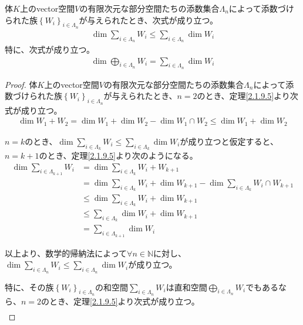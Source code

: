 \documentclass[dvipdfmx]{jsarticle}
\begin{document}
\begin{thm}\label{2.2.1.3}
体$K$上のvector空間$V$の有限次元な部分空間たちの添数集合$\varLambda_{n}$によって添数づけられた族$\left\{ W_{i} \right\}_{i \in \varLambda_{n}}$が与えられたとき、次式が成り立つ。
\begin{align*}
\dim{\sum_{i \in \varLambda_{n}} W_{i}} \leq \sum_{i \in \varLambda_{n}} {\dim W_{i}}
\end{align*}
特に、次式が成り立つ。
\begin{align*}
\dim{\bigoplus_{i \in \varLambda_{n}} W_{i}} = \sum_{i \in \varLambda_{n}} {\dim W_{i}}
\end{align*}
\end{thm}
\begin{proof}
体$K$上のvector空間$V$の有限次元な部分空間たちの添数集合$\varLambda_{n}$によって添数づけられた族$\left\{ W_{i} \right\}_{i \in \varLambda_{n}}$が与えられたとき、$n = 2$のとき、定理\ref{2.1.9.5}より次式が成り立つ。
\begin{align*}
\dim{W_{1} + W_{2}} = \dim W_{1} + \dim W_{2} - \dim{W_{1} \cap W_{2}} \leq \dim W_{1} + \dim W_{2}
\end{align*}\par
$n = k$のとき、$\dim{\sum_{i \in \varLambda_{k}} W_{i}} \leq \sum_{i \in \varLambda_{k}} {\dim W_{i}}$が成り立つと仮定すると、$n = k + 1$のとき、定理\ref{2.1.9.5}より次のようになる。
\begin{align*}
\dim{\sum_{i \in \varLambda_{k + 1}} W_{i}} &= \dim{\sum_{i \in \varLambda_{k}} W_{i} + W_{k + 1}}\\
&= \dim{\sum_{i \in \varLambda_{k}} W_{i}} + \dim W_{k + 1} - \dim{\sum_{i \in \varLambda_{k}} W_{i} \cap W_{k + 1}}\\
&\leq \dim{\sum_{i \in \varLambda_{k}} W_{i}} + \dim W_{k + 1}\\
&\leq \sum_{i \in \varLambda_{k}} {\dim W_{i}} + \dim W_{k + 1}\\
&= \sum_{i \in \varLambda_{k + 1}} {\dim W_{i}}
\end{align*}\par
以上より、数学的帰納法によって$\forall n \in \mathbb{N}$に対し、$\dim{\sum_{i \in \varLambda_{n}} W_{i}} \leq \sum_{i \in \varLambda_{n}} {\dim W_{i}}$が成り立つ。\par
特に、その族$\left\{ W_{i} \right\}_{i \in \varLambda_{n}}$の和空間$\sum_{i \in \varLambda_{n}} W_{i}$は直和空間$\bigoplus_{i \in \varLambda_{n}} W_{i}$でもあるなら、$n = 2$のとき、定理\ref{2.1.9.5}より次式が成り立つ。
\begin{align*}

\end{align*}
\end{proof}
\end{document}
